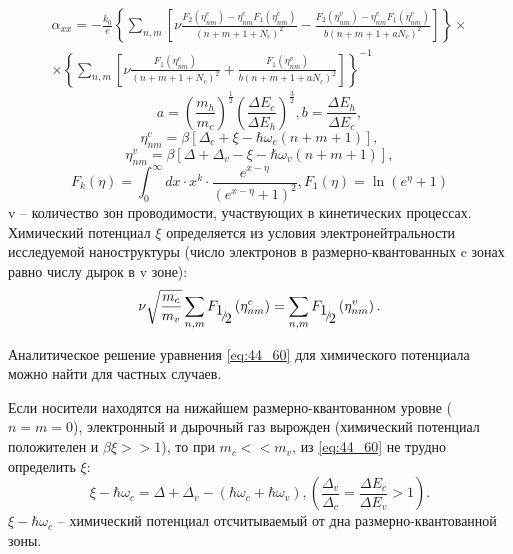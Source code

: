 \begin{multline} \label{eq:44_50}
\alpha _{xx} =-\frac{k_{0} }{e} \left\{\sum _{n,m}\left[\nu \frac{F_{2} \left(\eta _{nm}^{c} \right)-\eta _{nm}^{c} F_{1} \left(\eta _{nm}^{c} \right)}{\left(n+m+1+N_{c} \right)^{2} } -\frac{F_{2} \left(\eta _{nm}^{v} \right)-\eta _{nm}^{v} F_{1} \left(\eta _{nm}^{v} \right)}{b\left(n+m+1+aN_{c} \right)^{2} } \right] \right\}\times\\
\times \left\{\sum _{n,m}\left[\nu \frac{F_{1} \left(\eta _{nm}^{c} \right)}{\left(n+m+1+N_{c} \right)^{2} } +\frac{F_{1} \left(\eta _{nm}^{v} \right)}{b\left(n+m+1+aN_{c} \right)^{2} } \right] \right\}^{-1}
\end{multline}
\[
a=\left(\frac{m_{h} }{m_{c} } \right)^{\frac{1}{2} } \left(\frac{\Delta E_{c} }{\Delta E_{h} } \right)^{\frac{3}{2} } , b=\frac{\Delta E_{h} }{\Delta E_{c} } ,
\] 
\[
\eta _{nm}^{c} =\beta \left[\Delta _{c} +\xi -\hbar \omega _{c} \left(n+m+1\right)\right],
\] 
\[
\eta _{nm}^{v} =\beta \left[\Delta +\Delta _{v} -\xi -\hbar \omega _{v} \left(n+m+1\right)\right],
\] 
\[
F_{k} (\eta )=\int _{0}^{\infty }dx \cdot x^{k} \cdot \frac{e^{x-\eta } }{\left(e^{x-\eta } +1\right)^{2} } , F_{1} (\eta )=\ln \left(e^{\eta } +1\right)
\] 
v -- количество зон проводимости, участвующих в кинетических процессах. Химический потенциал $\xi $ определяется из условия электронейтральности исследуемой наноструктуры (число электронов в размерно-квантованных c зонах равно числу дырок в v зоне):
\begin{equation} \label{eq:44_60}
\nu \sqrt{\frac{m_{c} }{m_{v} } } \sum _{n,m}F_{{\raise0.7ex\hbox{$ 1 $}\!\mathord{\left/{\vphantom{1 2}}\right.\kern-\nulldelimiterspace}\!\lower0.7ex\hbox{$ 2 $}} } \left(\eta _{nm}^{c} \right) =\sum _{n,m}F_{{\raise0.7ex\hbox{$ 1 $}\!\mathord{\left/{\vphantom{1 2}}\right.\kern-\nulldelimiterspace}\!\lower0.7ex\hbox{$ 2 $}} } \left(\eta _{nm}^{v} \right) .
\end{equation}
 
Аналитическое решение уравнения \eqref{eq:44_60} для химического потенциала можно найти для частных случаев.
 
Если носители находятся на нижайшем размерно-квантованном уровне ($n=m=0$), электронный и дырочный газ вырожден (химический потенциал положителен и $\beta \xi >>1$), то при $m_{c} <<m_{v} $, из \eqref{eq:44_60} не трудно определить $\xi $:
\[
\xi -\hbar \omega _{c} =\Delta +\Delta _{v} -\left(\hbar \omega _{c} +\hbar \omega _{v} \right), \left(\frac{\Delta _{v} }{\Delta _{c} } =\frac{\Delta E_{c} }{\Delta E_{v} } >1\right).
\] 
$\xi -\hbar \omega _{c} $ -- химический потенциал отсчитываемый от дна размерно-квантованной зоны.

